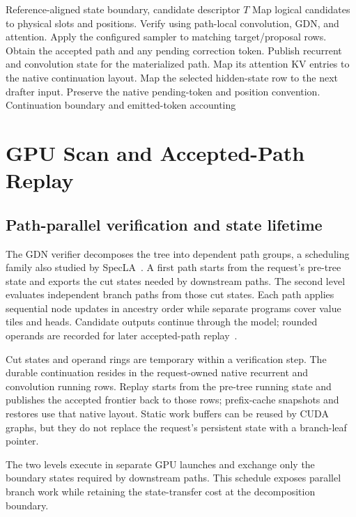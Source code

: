 \documentclass[conference]{IEEEtran}
\begin{document}
\begin{algorithm}[t]
\caption{Logical verifier and continuation boundary}
\label{alg:verify}
\begin{algorithmic}[1]
\REQUIRE Reference-aligned state boundary, candidate descriptor $T$
\STATE Map logical candidates to physical slots and positions.
\STATE Verify using path-local convolution, GDN, and attention.
\STATE Apply the configured sampler to matching target/proposal rows.
\STATE Obtain the accepted path and any pending correction token.
\STATE Publish recurrent and convolution state for the materialized path.
\STATE Map its attention KV entries to the native continuation layout.
\STATE Map the selected hidden-state row to the next drafter input.
\STATE Preserve the native pending-token and position convention.
\RETURN Continuation boundary and emitted-token accounting
\end{algorithmic}
\end{algorithm}

\section{GPU Scan and Accepted-Path Replay}
\label{sec:kernel}
\subsection{Path-parallel verification and state lifetime}
The GDN verifier decomposes the tree into dependent path groups, a scheduling family also studied by SpecLA~\cite{wang2026specla}. A first path starts from the request's pre-tree state and exports the cut states needed by downstream paths. The second level evaluates independent branch paths from those cut states. Each path applies sequential node updates in ancestry order while separate programs cover value tiles and heads. Candidate outputs continue through the model; rounded operands are recorded for later accepted-path replay~\cite{lumo2026archive}.

Cut states and operand rings are temporary within a verification step. The durable continuation resides in the request-owned native recurrent and convolution running rows. Replay starts from the pre-tree running state and publishes the accepted frontier back to those rows; prefix-cache snapshots and restores use that native layout. Static work buffers can be reused by CUDA graphs, but they do not replace the request's persistent state with a branch-leaf pointer.

The two levels execute in separate GPU launches and exchange only the boundary states required by downstream paths. This schedule exposes parallel branch work while retaining the state-transfer cost at the decomposition boundary.
\end{document}
